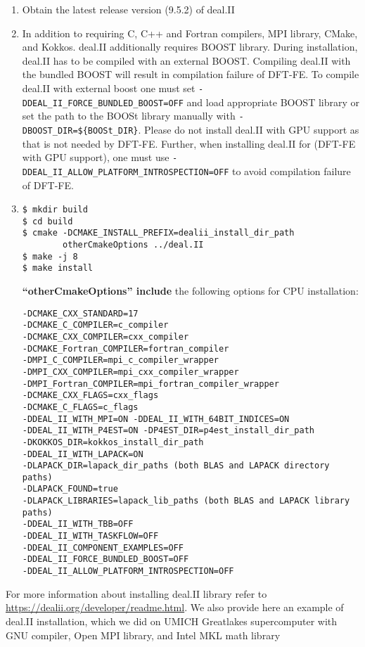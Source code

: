\begin{enumerate}

\item Obtain the latest release version (9.5.2) of deal.II

\item In addition to requiring C, C++ and Fortran compilers, MPI library, CMake, and Kokkos. deal.II additionally requires BOOST library. During installation, deal.II has to be compiled with an external BOOST. Compiling deal.II with the bundled BOOST will result in compilation failure of DFT-FE. To compile deal.II with external boost one must set \verb|-DDEAL_II_FORCE_BUNDLED_BOOST=OFF| and load appropriate BOOST library or set the path to the BOOSt library manually with \verb|-DBOOST_DIR=${BOOSt_DIR}|. Please do not install deal.II with GPU support as that is not needed by DFT-FE. Further, when installing deal.II for (DFT-FE with GPU support), one must use \verb|-DDEAL_II_ALLOW_PLATFORM_INTROSPECTION=OFF| to avoid compilation failure of DFT-FE.

\item
\begin{verbatim}
$ mkdir build
$ cd build
$ cmake -DCMAKE_INSTALL_PREFIX=dealii_install_dir_path
        otherCmakeOptions ../deal.II
$ make -j 8        
$ make install
\end{verbatim}
{\bf ``otherCmakeOptions'' include} the following options for CPU installation:
\begin{verbatim}
-DCMAKE_CXX_STANDARD=17
-DCMAKE_C_COMPILER=c_compiler
-DCMAKE_CXX_COMPILER=cxx_compiler
-DCMAKE_Fortran_COMPILER=fortran_compiler
-DMPI_C_COMPILER=mpi_c_compiler_wrapper
-DMPI_CXX_COMPILER=mpi_cxx_compiler_wrapper
-DMPI_Fortran_COMPILER=mpi_fortran_compiler_wrapper
-DCMAKE_CXX_FLAGS=cxx_flags
-DCMAKE_C_FLAGS=c_flags
-DDEAL_II_WITH_MPI=ON -DDEAL_II_WITH_64BIT_INDICES=ON
-DDEAL_II_WITH_P4EST=ON -DP4EST_DIR=p4est_install_dir_path
-DKOKKOS_DIR=kokkos_install_dir_path
-DDEAL_II_WITH_LAPACK=ON
-DLAPACK_DIR=lapack_dir_paths (both BLAS and LAPACK directory paths)
-DLAPACK_FOUND=true
-DLAPACK_LIBRARIES=lapack_lib_paths (both BLAS and LAPACK library paths)
-DDEAL_II_WITH_TBB=OFF
-DDEAL_II_WITH_TASKFLOW=OFF
-DDEAL_II_COMPONENT_EXAMPLES=OFF
-DDEAL_II_FORCE_BUNDLED_BOOST=OFF
-DDEAL_II_ALLOW_PLATFORM_INTROSPECTION=OFF
\end{verbatim}



\end{enumerate}	
 For more information about installing deal.II library refer to \url{https://dealii.org/developer/readme.html}. We also provide here an example of deal.II installation, which we did on UMICH Greatlakes supercomputer with GNU compiler, Open MPI library, and Intel MKL math library
